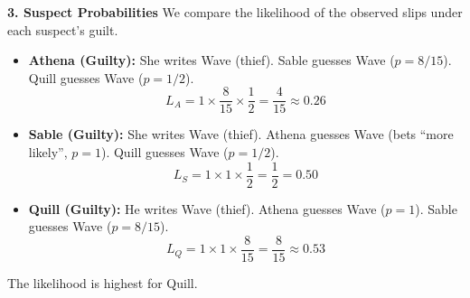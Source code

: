 \medskip

\textbf{3. Suspect Probabilities}
We compare the likelihood of the observed slips under each suspect's guilt.
\begin{itemize}
    \item \textbf{Athena (Guilty):} She writes Wave (thief). Sable guesses Wave (\(p=8/15\)). Quill guesses Wave (\(p=1/2\)).
    \[ L_A = 1 \times \frac{8}{15} \times \frac{1}{2} = \frac{4}{15} \approx 0.26 \]
    \item \textbf{Sable (Guilty):} She writes Wave (thief). Athena guesses Wave (bets ``more likely'', \(p=1\)). Quill guesses Wave (\(p=1/2\)).
    \[ L_S = 1 \times 1 \times \frac{1}{2} = \frac{1}{2} = 0.50 \]
    \item \textbf{Quill (Guilty):} He writes Wave (thief). Athena guesses Wave (\(p=1\)). Sable guesses Wave (\(p=8/15\)).
    \[ L_Q = 1 \times 1 \times \frac{8}{15} = \frac{8}{15} \approx 0.53 \]
\end{itemize}
The likelihood is highest for Quill.


\NextPage